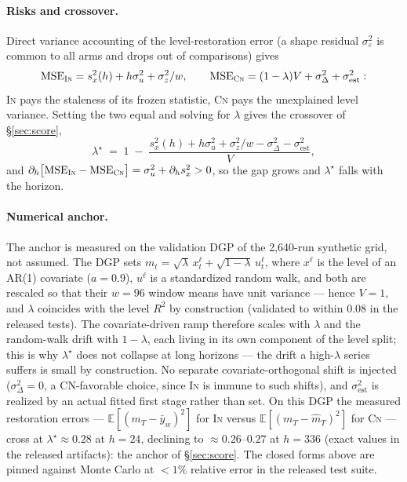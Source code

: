 \documentclass{article}
\newcommand{\mse}{\ensuremath{\mathrm{MSE}}}
\newcommand{\inm}{\textsc{In}}
\newcommand{\cnm}{\textsc{Cn}}
\begin{document}
\paragraph{Risks and crossover.} Direct variance accounting of the
level-restoration error (a shape residual $\sigma_\varepsilon^2$ is common to
all arms and drops out of comparisons) gives
\[
\mse_{\inm} = s_x^2(h) + h\sigma_u^2 + \sigma_z^2/w, \qquad
\mse_{\cnm} = (1-\lambda)V + \sigma_\Delta^2 + \sigma_{\mathrm{est}}^2 :
\]
\inm{} pays the staleness of its frozen statistic, \cnm{} pays the unexplained
level variance. Setting the two equal and solving for $\lambda$ gives the
crossover of \S\ref{sec:score},
\[
\lambda^\star \;=\; 1 \;-\;
\frac{s_x^2(h) + h\sigma_u^2 + \sigma_z^2/w - \sigma_\Delta^2 - \sigma_{\mathrm{est}}^2}{V},
\]
and $\partial_h\bigl[\mse_{\inm} - \mse_{\cnm}\bigr] = \sigma_u^2 + \partial_h
s_x^2 > 0$, so the gap grows and $\lambda^\star$ falls with the horizon.

\paragraph{Numerical anchor.} The anchor is measured on the validation DGP of
the 2{,}640-run synthetic grid, not assumed. The DGP sets
$m_t = \sqrt{\lambda}\,x^\ell_t + \sqrt{1-\lambda}\,u^\ell_t$, where $x^\ell$
is the level of an AR(1) covariate ($a{=}0.9$), $u^\ell$ is a standardized
random walk, and both are rescaled so that their $w{=}96$ window means have
unit variance --- hence $V{=}1$, and $\lambda$ coincides with the level $R^2$
by construction (validated to within $0.08$ in the released tests). The
covariate-driven ramp therefore scales with $\lambda$ and the random-walk
drift with $1-\lambda$, each living in its own component of the level split;
this is why $\lambda^\star$ does not collapse at long horizons --- the drift a
high-$\lambda$ series suffers is small by construction. No separate
covariate-orthogonal shift is injected ($\sigma_\Delta^2 = 0$, a CN-favorable
choice, since \inm{} is immune to such shifts), and $\sigma_{\mathrm{est}}^2$
is realized by an actual fitted first stage rather than set. On this DGP the
measured restoration errors --- $\mathbb E[(m_T-\bar y_w)^2]$ for \inm{}
versus $\mathbb E[(m_T-\hat m_T)^2]$ for \cnm{} --- cross at
$\lambda^\star \approx 0.28$ at $h{=}24$, declining to ${\approx}0.26$--$0.27$
at $h{=}336$ (exact values in the released artifacts): the anchor of
\S\ref{sec:score}. The closed forms above are pinned against Monte Carlo at
${<}1\%$ relative error in the released test suite.
\end{document}
